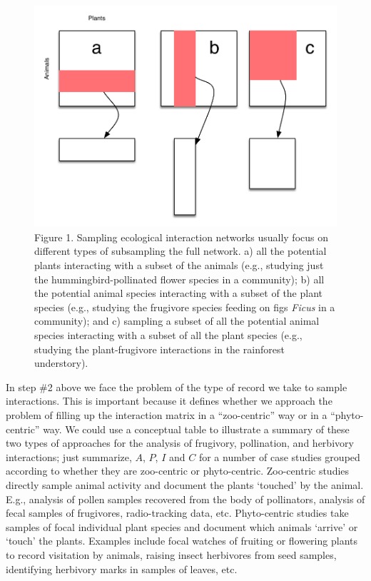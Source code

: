 \documentclass[a4paper,12pt]{article}
\begin{document}
\begin{spacing}{1.0}
\begin{figure}[htbp]
\centering
\includegraphics[keepaspectratio,width=\textwidth,height=0.75\textheight]{../figures/Fig1.pdf}
\caption{Figure 1. Sampling ecological interaction networks usually focus on different types of subsampling the full network. a) all the potential plants interacting with a subset of the animals (e.g., studying just the hummingbird-pollinated flower species in a community); b) all the potential animal species interacting with a subset of the plant species (e.g., studying the frugivore species feeding on figs \emph{Ficus} in a community); and c) sampling a subset of all the potential animal species interacting with a subset of all the plant species (e.g., studying the plant-frugivore interactions in the rainforest understory).}
\end{figure}

In step \#2 above we face the problem of the type of record we take to sample interactions. This is important because it defines whether we approach the problem of filling up the interaction matrix in a ``zoo-centric'' way or in a ``phyto-centric'' way. We could use a conceptual table to illustrate a summary of these two types of approaches for the analysis of frugivory, pollination, and herbivory interactions; just summarize, $A$, $P$, $I$ and $C$ for a number of case studies grouped according to whether they are zoo-centric or phyto-centric. Zoo-centric studies directly sample animal activity and document the plants `touched' by the animal. E.g., analysis of pollen samples recovered from the body of pollinators, analysis of fecal samples of frugivores, radio-tracking data, etc.
Phyto-centric studies take samples of focal individual plant species and document which animals `arrive' or `touch' the plants. Examples include focal watches of fruiting or flowering plants to record visitation by animals, raising insect herbivores from seed samples, identifying herbivory marks in samples of leaves, etc.


\end{spacing}
\end{document}
